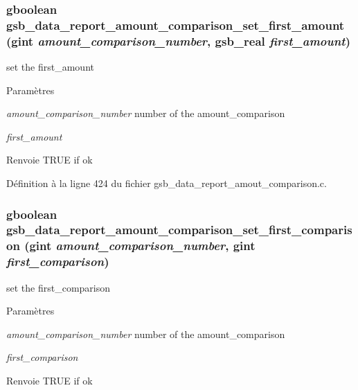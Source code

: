 \subsubsection[{gsb\_\-data\_\-report\_\-amount\_\-comparison\_\-set\_\-first\_\-amount}]{\setlength{\rightskip}{0pt plus 5cm}gboolean gsb\_\-data\_\-report\_\-amount\_\-comparison\_\-set\_\-first\_\-amount (gint {\em amount\_\-comparison\_\-number}, \/  {\bf gsb\_\-real} {\em first\_\-amount})}\label{gsb__data__report__amout__comparison_8c_a1c4b398e3b439b02ce732e3ac21dc9e5}
set the first\_\-amount


\begin{DoxyParams}{Paramètres}
\item[{\em amount\_\-comparison\_\-number}]number of the amount\_\-comparison \item[{\em first\_\-amount}]\end{DoxyParams}
\begin{DoxyReturn}{Renvoie}
TRUE if ok 
\end{DoxyReturn}


Définition à la ligne 424 du fichier gsb\_\-data\_\-report\_\-amout\_\-comparison.c.

\subsubsection[{gsb\_\-data\_\-report\_\-amount\_\-comparison\_\-set\_\-first\_\-comparison}]{\setlength{\rightskip}{0pt plus 5cm}gboolean gsb\_\-data\_\-report\_\-amount\_\-comparison\_\-set\_\-first\_\-comparison (gint {\em amount\_\-comparison\_\-number}, \/  gint {\em first\_\-comparison})}\label{gsb__data__report__amout__comparison_8c_ad95131531a1d7eb83d7ca876a705f343}
set the first\_\-comparison


\begin{DoxyParams}{Paramètres}
\item[{\em amount\_\-comparison\_\-number}]number of the amount\_\-comparison \item[{\em first\_\-comparison}]\end{DoxyParams}
\begin{DoxyReturn}{Renvoie}
TRUE if ok 
\end{DoxyReturn}



